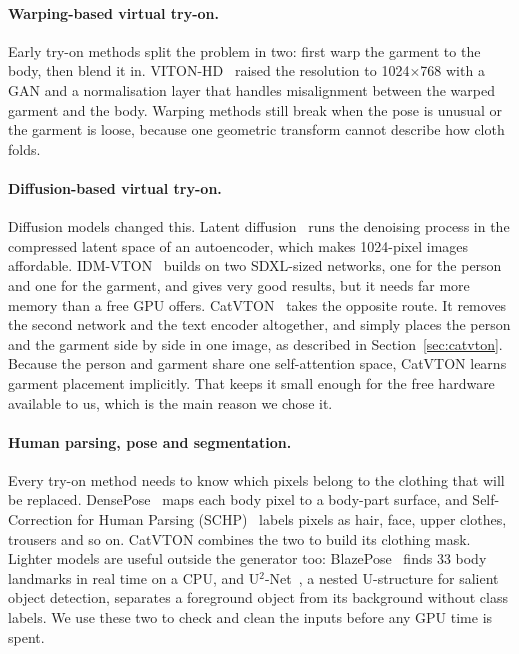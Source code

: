 \documentclass{article}
\newcommand{\unet}{U$^2$-Net}
\begin{document}
\paragraph{Warping-based virtual try-on.}
Early try-on methods split the problem in two: first warp the garment to the body, then blend it in.
VITON-HD~\cite{vitonhd} raised the resolution to 1024$\times$768 with a GAN and a normalisation layer
that handles misalignment between the warped garment and the body. Warping methods still break when
the pose is unusual or the garment is loose, because one geometric transform cannot describe how cloth
folds.

\paragraph{Diffusion-based virtual try-on.}
Diffusion models changed this. Latent diffusion~\cite{ldm} runs the denoising process in the
compressed latent space of an autoencoder, which makes 1024-pixel images affordable. IDM-VTON~\cite{idmvton}
builds on two SDXL-sized networks, one for the person and one for the garment, and gives very good
results, but it needs far more memory than a free GPU offers. CatVTON~\cite{catvton} takes the
opposite route. It removes the second network and the text encoder altogether, and simply places the
person and the garment side by side in one image, as described in Section~\ref{sec:catvton}.
Because the person and garment share one self-attention space, CatVTON learns garment placement
implicitly. That keeps it small enough for the free hardware available to us, which is the
main reason we chose it.

\paragraph{Human parsing, pose and segmentation.}
Every try-on method needs to know which pixels belong to the clothing that will be replaced. DensePose~\cite{densepose}
maps each body pixel to a body-part surface, and Self-Correction for Human Parsing (SCHP)~\cite{schp}
labels pixels as hair, face, upper clothes, trousers and so on. CatVTON combines the two to build its
clothing mask. Lighter models are useful outside the generator too: BlazePose~\cite{blazepose} finds 33
body landmarks in real time on a CPU, and \unet~\cite{u2net}, a nested U-structure for salient object
detection, separates a foreground object from its background without class labels. We use these two
to check and clean the inputs before any GPU time is spent.
\end{document}
